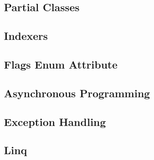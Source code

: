 \subsection{Partial Classes}
\label{partialClass}


\subsection{Indexers}
\label{indexers}


\subsection{Flags Enum Attribute}
\label{flags}


\subsection{Asynchronous Programming}
\label{asynchronousProgramming}


\subsection{Exception Handling}
\label{exceptionHandling}


\subsection{Linq}
\label{linq}
